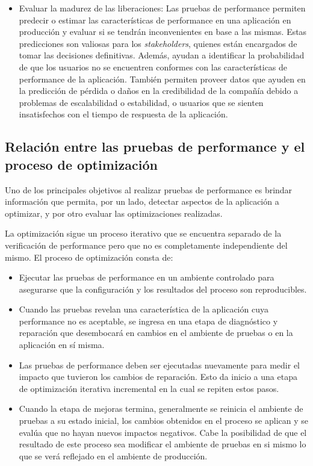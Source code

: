 \begin{itemize}
  \item 
  	Evaluar la madurez de las liberaciones:
  	Las pruebas de performance permiten predecir o estimar las características de performance en una aplicación en producción y evaluar si se tendrán inconvenientes en base a las mismas. Estas predicciones son valiosas para los \emph{stakeholders}, quienes están encargados de tomar las decisiones definitivas.
  	Además, ayudan a identificar la probabilidad de que los usuarios no se encuentren conformes con las características de performance de la aplicación. También permiten proveer datos que ayuden en la predicción de pérdida o daños en la credibilidad de la compañía debido a problemas de escalabilidad o estabilidad, o usuarios que se sienten insatisfechos con el tiempo de respuesta de la aplicación.
\end{itemize}

\subsection{ Relación entre las pruebas de performance y el proceso de optimización }
Uno de los principales objetivos al realizar pruebas de performance es brindar información que permita, por un lado, detectar aspectos de la aplicación a optimizar, y por otro evaluar las optimizaciones realizadas.

La optimización sigue un proceso iterativo que se encuentra separado de la verificación de performance pero que no es completamente independiente del mismo. El proceso de
optimización consta de:
\begin{itemize}
	\item
	Ejecutar las pruebas de performance en un ambiente controlado para asegurarse que la configuración y los resultados del proceso son reproducibles.
	\item
	Cuando las pruebas revelan una característica de la aplicación cuya performance no es aceptable, se ingresa en una etapa de diagnóstico y reparación que desembocará en cambios
	en el ambiente de pruebas o en la aplicación en sí misma.
	\item
	Las pruebas de performance deben ser ejecutadas nuevamente para medir el impacto que tuvieron los cambios de reparación. Esto da inicio a una etapa de optimización iterativa
	incremental en la cual se repiten estos pasos.
	\item
	Cuando la etapa de mejoras termina, generalmente se reinicia el ambiente de pruebas a su estado inicial, los cambios obtenidos en el proceso se aplican y se evalúa que no hayan
	nuevos impactos negativos. Cabe la posibilidad de que el resultado de este proceso sea modificar el ambiente de pruebas en si mismo lo que se verá reflejado en el ambiente de
	producción.
\end{itemize}


